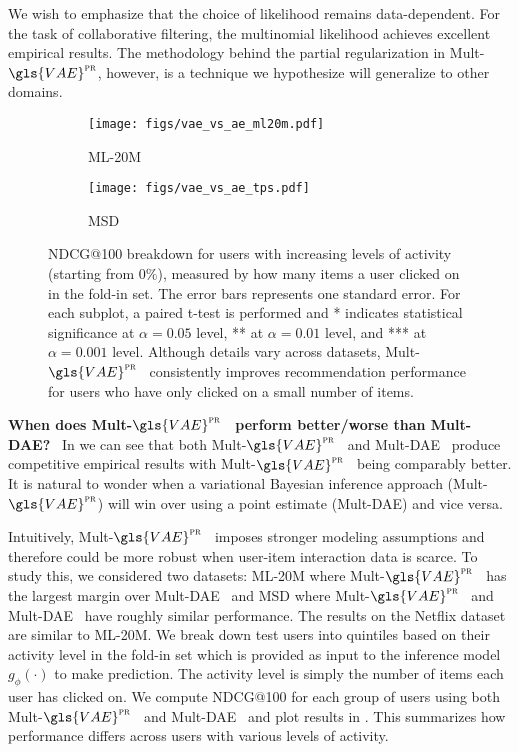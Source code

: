\documentclass[sigconf]{acmart}
\DeclareRobustCommand{\parhead}[1]{\textbf{#1}~}
\newcommand{\mvae}{{\small Mult-}$\gls{VAE}^{\text{\sc pr}}$}
\newcommand{\mdae}{{\small Mult-}\gls{DAE}}
\begin{document}
We wish to emphasize that the choice of likelihood remains data-dependent. For the task of collaborative filtering, the multinomial likelihood achieves excellent empirical results.
The methodology behind the partial regularization in \mvae, however, is a technique we hypothesize will 
generalize to other domains. 

\begin{figure*}[!ht]
  \centering
  \centering
    \begin{subfigure}[b]{\textwidth}
  \texttt{[image: figs/vae\_vs\_ae\_ml20m.pdf]}
        \caption{ML-20M}
        \label{fig:vae_ae_ml20m}
    \end{subfigure}

   \begin{subfigure}[b]{\textwidth}
  \texttt{[image: figs/vae\_vs\_ae\_tps.pdf]}
        \caption{MSD}
        \label{fig:vae_ae_msd}
    \end{subfigure}

    \caption{NDCG@100 breakdown for users with increasing levels of activity (starting from $0\%$), measured by how many items a user clicked on in the fold-in set. The error bars represents one standard error. For each subplot, a paired t-test is performed and * indicates statistical significance at $\alpha=0.05$ level, ** at $\alpha=0.01$ level, and *** at $\alpha=0.001$ level. Although details vary across datasets, \mvae~ consistently improves recommendation performance for users who have only clicked on a small number of items.}\label{fig:vae_ae}

\end{figure*}

\parhead{When does \mvae~ perform better/worse than \mdae?}
In  we can see that both \mvae~ and \mdae~ produce competitive empirical results with \mvae~ being comparably better. It is natural to wonder when a variational Bayesian inference approach (\mvae) will win over using a point estimate (\mdae) and vice versa. 

Intuitively, \mvae~ imposes stronger modeling assumptions and therefore could be more robust when user-item interaction data is scarce. To study this, we considered two datasets: ML-20M where \mvae~ has the largest margin over \mdae~ and MSD where \mvae~ and \mdae~ have roughly similar performance. The results on the Netflix dataset are similar to ML-20M. 
We break down test users into quintiles based on their activity level in the fold-in set which is provided as input to the inference model $g_\phi(\cdot)$ to make prediction. The activity level is simply the number of items each user has clicked on. We compute NDCG@100 for each group of users using both \mvae~ and \mdae~ and plot results in . This summarizes how performance differs across users with various levels of activity. 
\end{document}
